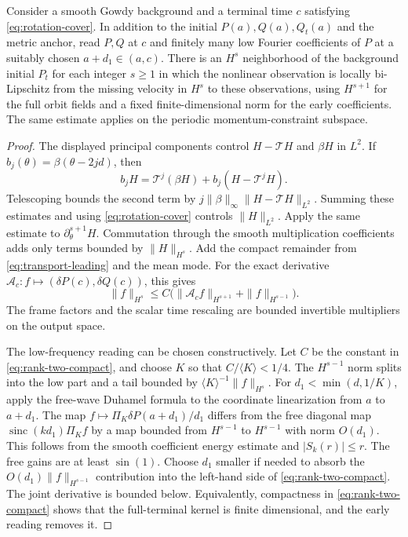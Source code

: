 \begin{theorem}
\label{th:fixed-rank-two}
Consider a smooth Gowdy background and a terminal time
$c$ satisfying \eqref{eq:rotation-cover}. In addition to the initial
$P(a),Q(a),Q_t(a)$ and the metric anchor, read $P,Q$ at $c$
and finitely many low Fourier coefficients of $P$ at a
suitably chosen $a+d_1\in(a,c)$.
There is an $H^s$ neighborhood of the background initial
$P_t$ for each integer $s\ge1$ in which the nonlinear
observation is locally bi-Lipschitz from the missing
velocity in $H^s$ to these observations, using $H^{s+1}$
for the full orbit fields and a fixed finite-dimensional
norm for the early coefficients. The same estimate applies on the
periodic momentum-constraint subspace.
\end{theorem}

\begin{proof}
The displayed principal components control
$H-\mathcal T H$ and $\beta H$ in $L^2$.
If $b_j(\theta)=\beta(\theta-2jd)$, then
\[
 b_j H = \mathcal T^j(\beta H)+b_j(H-\mathcal T^j H).
\]
Telescoping bounds the second term by
$j\|\beta\|_\infty\|H-\mathcal T H\|_{L^2}$.
Summing these estimates and using \eqref{eq:rotation-cover}
controls $\|H\|_{L^2}$.
Apply the same estimate to $\partial_\theta^{s+1}H$.
Commutation through the smooth multiplication coefficients
adds only terms bounded by $\|H\|_{H^s}$.
Add the compact remainder from \eqref{eq:transport-leading}
and the mean mode. For the exact derivative
$\mathcal A_c:f\mapsto (\delta P(c),\delta Q(c))$,
this gives
\begin{equation}
 \|f\|_{H^s}\le C
    \big(\|\mathcal A_c f\|_{H^{s+1}}+\|f\|_{H^{s-1}}\big).
 \label{eq:rank-two-compact}
\end{equation}
The frame factors and the scalar time rescaling
are bounded invertible multipliers on the output space.


The low-frequency reading can be chosen constructively.
Let $C$ be the constant in \eqref{eq:rank-two-compact},
and choose $K$ so that $C/\langle K\rangle<1/4$.
The $H^{s-1}$ norm splits into the low part and a tail
bounded by $\langle K\rangle^{-1}\|f\|_{H^s}$.
For $d_1<\min(d,1/K)$, apply the free-wave Duhamel formula
to the coordinate linearization from $a$ to $a+d_1$.
The map $f\mapsto\Pi_K\delta P(a+d_1)/d_1$
differs from the free diagonal map
$\operatorname{sinc}(k d_1)\Pi_Kf$
by a map bounded from $H^{s-1}$ to $H^{s-1}$ with norm
$O(d_1)$. This follows from the smooth coefficient
energy estimate and $|S_k(r)|\le r$.
The free gains are at least $\sin(1)$.
Choose $d_1$ smaller if needed to absorb
the $O(d_1)\|f\|_{H^{s-1}}$ contribution into the
left-hand side of \eqref{eq:rank-two-compact}.
The joint derivative is bounded below.
Equivalently, compactness in \eqref{eq:rank-two-compact}
shows that the full-terminal kernel is finite dimensional,
and the early reading removes it.


\end{proof}
